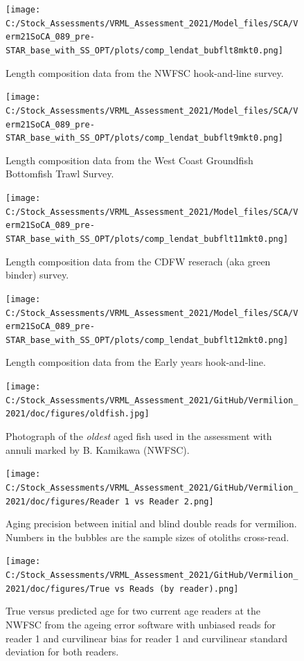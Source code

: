 \documentclass[
  english,
  a4paper,
]{article}
\begin{document}
\begin{figure}
\centering
\texttt{[image: C:/Stock\_Assessments/VRML\_Assessment\_2021/Model\_files/SCA/Verm21SoCA\_089\_pre-STAR\_base\_with\_SS\_OPT/plots/comp\_lendat\_bubflt8mkt0.png]}
\caption{Length composition data from the NWFSC hook-and-line survey.\label{fig:len-data-NWFSC-HKL}}
\end{figure}

\begin{figure}
\centering
\texttt{[image: C:/Stock\_Assessments/VRML\_Assessment\_2021/Model\_files/SCA/Verm21SoCA\_089\_pre-STAR\_base\_with\_SS\_OPT/plots/comp\_lendat\_bubflt9mkt0.png]}
\caption{Length composition data from the West Coast Groundfish Bottomfish Trawl Survey.\label{fig:len-data-NWFSC-TWL}}
\end{figure}

\begin{figure}
\centering
\texttt{[image: C:/Stock\_Assessments/VRML\_Assessment\_2021/Model\_files/SCA/Verm21SoCA\_089\_pre-STAR\_base\_with\_SS\_OPT/plots/comp\_lendat\_bubflt11mkt0.png]}
\caption{Length composition data from the CDFW reserach (aka green binder) survey.\label{fig:len-data-CDFW-RESEARCH}}
\end{figure}

\begin{figure}
\centering
\texttt{[image: C:/Stock\_Assessments/VRML\_Assessment\_2021/Model\_files/SCA/Verm21SoCA\_089\_pre-STAR\_base\_with\_SS\_OPT/plots/comp\_lendat\_bubflt12mkt0.png]}
\caption{Length composition data from the Early years hook-and-line.\label{fig:len-data-EARLY-HKL}}
\end{figure}

\begin{figure}
\centering
\texttt{[image: C:/Stock\_Assessments/VRML\_Assessment\_2021/GitHub/Vermilion\_2021/doc/figures/oldfish.jpg]}
\caption{Photograph of the \emph{oldest} aged fish used in the assessment with annuli marked by B. Kamikawa (NWFSC).\label{fig:oldfish}}
\end{figure}

\begin{figure}
\centering
\texttt{[image: C:/Stock\_Assessments/VRML\_Assessment\_2021/GitHub/Vermilion\_2021/doc/figures/Reader 1 vs Reader 2.png]}
\caption{Aging precision between initial and blind double reads for vermilion.
Numbers in the bubbles are the sample sizes of otoliths cross-read.\label{fig:reader1reader2}}
\end{figure}

\begin{figure}
\centering
\texttt{[image: C:/Stock\_Assessments/VRML\_Assessment\_2021/GitHub/Vermilion\_2021/doc/figures/True vs Reads (by reader).png]}
\caption{True versus predicted age for two current age readers at the NWFSC
from the ageing error software with unbiased reads for reader 1 and curvilinear
bias for reader 1 and curvilinear standard deviation for both readers.\label{fig:truereads}}
\end{figure}
\end{document}
